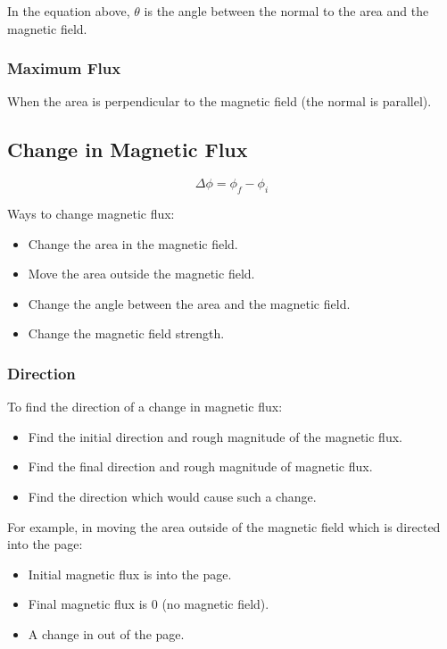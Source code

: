 \documentclass[a4paper,11pt]{article}
\begin{document}
In the equation above, $\theta$ is the angle between the normal to the area
and the magnetic field.


\subsubsection{Maximum Flux}

When the area is perpendicular to the magnetic field (the normal is parallel).


\subsection{Change in Magnetic Flux}

$$
\Delta \phi = \phi_f - \phi_i
$$

Ways to change magnetic flux:

\begin{itemize}
\item Change the area in the magnetic field.
\item Move the area outside the magnetic field.
\item Change the angle between the area and the magnetic field.
\item Change the magnetic field strength.
\end{itemize}


\subsubsection{Direction}

To find the direction of a change in magnetic flux:

\begin{itemize}
\item Find the initial direction and rough magnitude of the magnetic flux.
\item Find the final direction and rough magnitude of magnetic flux.
\item Find the direction which would cause such a change.
\end{itemize}

For example, in moving the area outside of the magnetic field which is directed
into the page:

\begin{itemize}
\item Initial magnetic flux is into the page.
\item Final magnetic flux is 0 (no magnetic field).
\item A change in out of the page.
\end{itemize}
\end{document}
